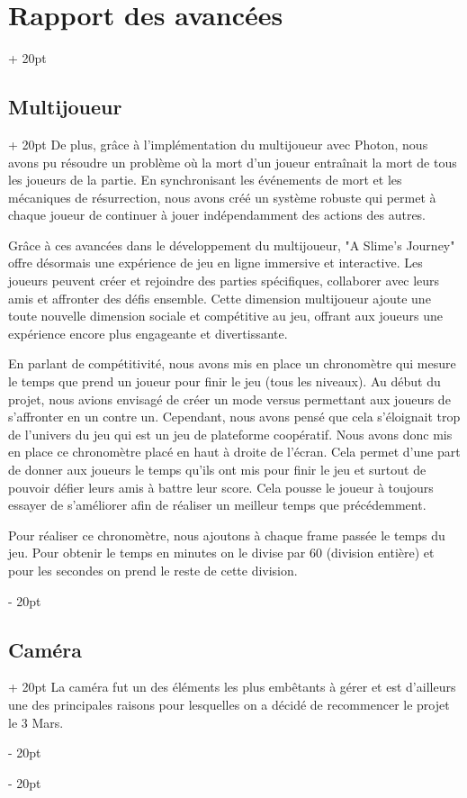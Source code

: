 \documentclass[a4paper, 12pt, twoside]{article}
\newcommand{\ind}[1][20pt]{\advance\leftskip + #1}
\newcommand{\deind}[1][20pt]{\advance\leftskip - #1}
\newenvironment{indt}[2][20pt]{#2 \par \ind[#1]}{\par \deind} %
\begin{document}
\begin{indt}{\section{Rapport des avancées}}
\begin{indt}{\subsection{Multijoueur}}
            De plus, grâce à l'implémentation du multijoueur avec Photon, nous avons pu résoudre un problème où la mort d'un joueur entraînait la mort de tous les joueurs de la partie. En synchronisant les événements de mort et les mécaniques de résurrection, nous avons créé un système robuste qui permet à chaque joueur de continuer à jouer indépendamment des actions des autres.

            Grâce à ces avancées dans le développement du multijoueur, "A Slime's Journey" offre désormais une expérience de jeu en ligne immersive et interactive. Les joueurs peuvent créer et rejoindre des parties spécifiques, collaborer avec leurs amis et affronter des défis ensemble. Cette dimension multijoueur ajoute une toute nouvelle dimension sociale et compétitive au jeu, offrant aux joueurs une expérience encore plus engageante et divertissante.

            En parlant de compétitivité, nous avons mis en place un chronomètre qui mesure le temps que prend un joueur pour finir le jeu (tous les niveaux). Au début du projet, nous avions envisagé de créer un mode versus permettant aux joueurs de s’affronter en un contre un. Cependant, nous avons pensé que cela s'éloignait trop de l’univers du jeu qui est un jeu de plateforme coopératif. Nous avons donc mis en place ce chronomètre placé en haut à droite de l’écran. Cela permet d’une part de donner aux joueurs le temps qu’ils ont mis pour finir le jeu et surtout de pouvoir défier leurs amis à battre leur score. Cela pousse le joueur à toujours essayer de s’améliorer afin de réaliser un meilleur temps que précédemment.

            Pour réaliser ce chronomètre, nous ajoutons à chaque frame passée le temps du jeu. Pour obtenir le temps en minutes on le divise par 60 (division entière) et pour les secondes on prend le reste de cette division.

        \end{indt}

        \begin{indt}{\subsection{Caméra}}
            La caméra fut un des éléments les plus embêtants à gérer et est d'ailleurs une des principales raisons pour lesquelles on a décidé de recommencer le projet le 3 Mars.


\end{indt}
\end{indt}
\end{document}
